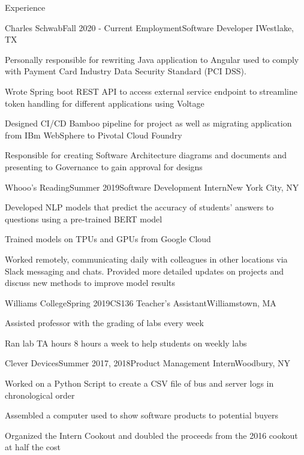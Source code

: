 \documentclass{resume} %
\begin{document}
\begin{rSection}{Experience}

\begin{rSubsection}{Charles Schwab}{Fall 2020 - Current Employment}{Software Developer I}{Westlake, TX}
\item Personally responsible for rewriting Java application to Angular used to comply with Payment Card Industry Data Security Standard (PCI DSS).
\item Wrote Spring boot REST API to access external service endpoint to streamline token handling for different applications using Voltage
\item Designed CI/CD Bamboo pipeline for project as well as migrating application from IBm WebSphere to Pivotal Cloud Foundry
\item Responsible for creating Software Architecture diagrams and documents and presenting to Governance to gain approval for designs
\end{rSubsection}


\begin{rSubsection}{Whooo’s Reading}{Summer 2019}{Software Development Intern}{New York City, NY}
\item Developed NLP models that predict the accuracy of students’ answers to questions using a pre-trained BERT model
\item Trained models on TPUs and GPUs from Google Cloud
\item Worked remotely, communicating daily with colleagues in other locations via Slack messaging and chats. Provided more detailed updates on projects and discuss new methods to improve model results
\end{rSubsection}


\begin{rSubsection}{Williams College}{Spring 2019}{CS136 Teacher's Assistant}{Williamstown, MA}
\item Assisted professor with the grading of labs every week
\item Ran lab TA hours 8 hours a week to help students on weekly labs
\end{rSubsection}


\begin{rSubsection}{Clever Devices}{Summer 2017, 2018}{Product Management Intern}{Woodbury, NY}
\item Worked on a Python Script to create a CSV file of bus and server logs in chronological order
\item Assembled a computer used to show software products to potential buyers
\item Organized the Intern Cookout and doubled the proceeds from the 2016 cookout at half the cost
\end{rSubsection}


\end{rSection}
\end{document}
